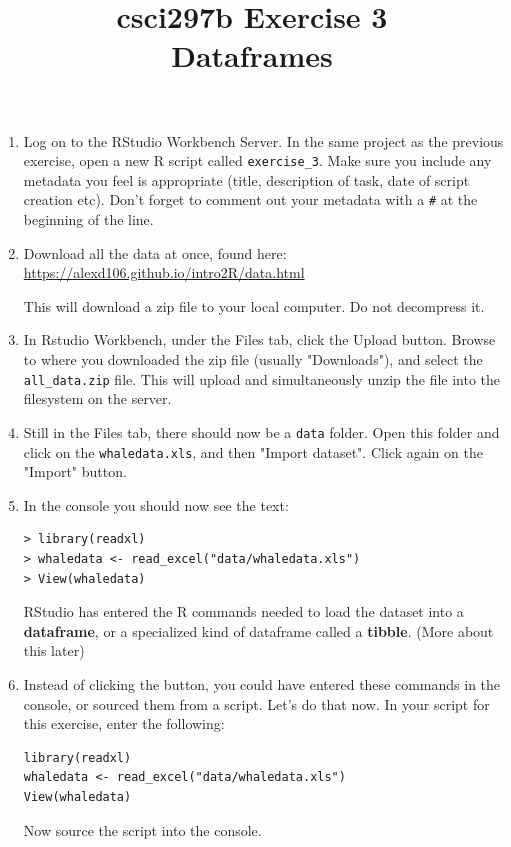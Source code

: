 \documentclass[12pt]{article}
\title{csci297b Exercise 3\\Dataframes }
\date{}
\begin{document}
\maketitle

\begin{enumerate}

\centerline{\bf Part 1}


\item Log on to the RStudio Workbench Server. 
In the same project as the previous exercise, open a new R script called 
\verb|exercise_3|.
Make sure you include any metadata you feel is appropriate (title, description of task, date of script creation etc). Don’t forget to comment out your metadata with a \lstinline{#} at the beginning of the line.

\item Download all the data at once, found here: \url{https://alexd106.github.io/intro2R/data.html}

This will download a zip file to your local computer.  Do not decompress it.  

\item In Rstudio Workbench, under the Files tab, click the Upload button.  Browse to 
where you downloaded the zip file (usually "Downloads"), and select the 
\verb|all_data.zip| file.  This will upload and simultaneously unzip
the file into the filesystem on the server.

\item Still in the Files tab, there should now be a \verb|data| folder.  Open this folder
and click on the \verb|whaledata.xls|, and then "Import dataset".  Click again
on the "Import" button.

\item In the console you should now see the text:
\begin{lstlisting}
> library(readxl)
> whaledata <- read_excel("data/whaledata.xls")
> View(whaledata)                                                                        
\end{lstlisting}
RStudio has entered the R commands needed to load the dataset into a {\bf dataframe},
or a specialized kind of dataframe called a {\bf tibble}.  (More about this later)

\item
Instead of clicking the button, you could have entered these commands
in the console, or sourced them from a script.  Let's do that now.  In your
script for this exercise, enter the following:
\begin{lstlisting}
library(readxl)
whaledata <- read_excel("data/whaledata.xls")
View(whaledata)                                                                        
\end{lstlisting}
Now source the script into the console.  


\end{enumerate}
\end{document}
